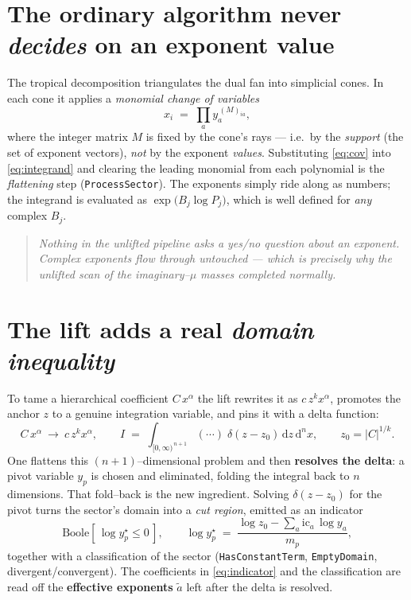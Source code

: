 \documentclass[11pt]{article}
\newcommand{\atil}{\tilde{a}}
\newcommand{\code}[1]{\texttt{#1}}
\begin{document}
\section{The ordinary algorithm never \emph{decides} on an exponent value}

The tropical decomposition triangulates the dual fan into simplicial cones. In each
cone it applies a \emph{monomial change of variables}
\begin{equation}
  x_i \;=\; \prod_{a} y_a^{\,(M)_{ia}},
  \label{eq:cov}
\end{equation}
where the integer matrix $M$ is fixed by the cone's rays --- i.e.\ by the
\emph{support} (the set of exponent vectors), \emph{not} by the exponent
\emph{values}. Substituting \eqref{eq:cov} into \eqref{eq:integrand} and clearing the
leading monomial from each polynomial is the \emph{flattening} step
(\code{ProcessSector}). The exponents simply ride along as numbers; the integrand is
evaluated as $\exp\!\big(B_j \log P_j\big)$, which is well defined for \emph{any}
complex $B_j$.

\begin{quote}\itshape
Nothing in the unlifted pipeline asks a yes/no question about an exponent. Complex
exponents flow through untouched --- which is precisely why the unlifted scan of the
imaginary--$\mu$ masses completed normally.
\end{quote}

\section{The lift adds a real \emph{domain inequality}}

To tame a hierarchical coefficient $C\,x^{\alpha}$ the lift rewrites it as
$c\,z^{k} x^{\alpha}$, promotes the anchor $z$ to a genuine integration variable, and
pins it with a delta function:
\begin{equation}
  C\,x^{\alpha}\ \longrightarrow\ c\,z^{k}x^{\alpha},
  \qquad
  I \;=\; \int_{[0,\infty)^{\,n+1}} (\cdots)\;\delta(z-z_0)\,\mathrm{d}z\,\mathrm{d}^n x ,
  \qquad z_0 = |C|^{1/k}.
\end{equation}
One flattens this $(n{+}1)$--dimensional problem and then \textbf{resolves the
delta}: a pivot variable $y_p$ is chosen and eliminated, folding the integral back to
$n$ dimensions. That fold--back is the new ingredient. Solving $\delta(z-z_0)$ for the
pivot turns the sector's domain into a \emph{cut region}, emitted as an indicator
\begin{equation}
  \mathrm{Boole}\!\left[\, \log y_p^{\star} \le 0 \,\right],
  \qquad
  \log y_p^{\star}
   \;=\; \frac{\log z_0 - \sum_a \mathrm{ic}_a \,\log y_a}{m_p},
  \label{eq:indicator}
\end{equation}
together with a classification of the sector (\code{HasConstantTerm},
\code{EmptyDomain}, divergent/convergent). The coefficients in \eqref{eq:indicator}
and the classification are read off the \textbf{effective exponents} $\atil$ left
after the delta is resolved.
\end{document}
